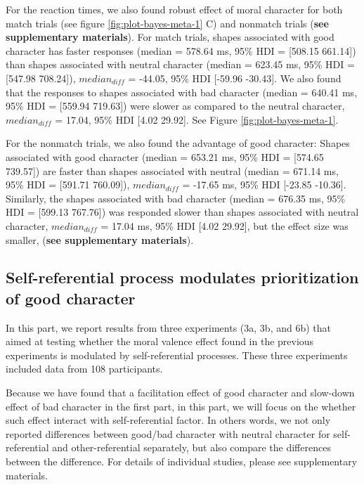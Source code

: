 \documentclass[
  man]{apa6}
\begin{document}
For the reaction times, we also found robust effect of moral character for both match trials (see figure \ref{fig:plot-bayes-meta-1} C) and nonmatch trials (\textbf{see supplementary materials}). For match trials, shapes associated with good character has faster responses (median = 578.64 ms, 95\% HDI = {[}508.15 661.14{]}) than shapes associated with neutral character (median = 623.45 ms, 95\% HDI = {[}547.98 708.24{]}), \(median_{diff}\) = -44.05, 95\% HDI {[}-59.96 -30.43{]}. We also found that the responses to shapes associated with bad character (median = 640.41 ms, 95\% HDI = {[}559.94 719.63{]}) were slower as compared to the neutral character, \(median_{diff}\) = 17.04, 95\% HDI {[}4.02 29.92{]}. See Figure \ref{fig:plot-bayes-meta-1}.

For the nonmatch trials, we also found the advantage of good character: Shapes associated with good character (median = 653.21 ms, 95\% HDI = {[}574.65 739.57{]}) are faster than shapes associated with neutral (median = 671.14 ms, 95\% HDI = {[}591.71 760.09{]}), \(median_{diff}\) = -17.65 ms, 95\% HDI {[}-23.85 -10.36{]}. Similarly, the shapes associated with bad character (median = 676.35 ms, 95\% HDI = {[}599.13 767.76{]}) was responded slower than shapes associated with neutral character, \(median_{diff}\) = 17.04 ms, 95\% HDI {[}4.02 29.92{]}, but the effect size was smaller, (\textbf{see supplementary materials}).

\hypertarget{self-referential-process-modulates-prioritization-of-good-character}{%
\subsection{Self-referential process modulates prioritization of good character}\label{self-referential-process-modulates-prioritization-of-good-character}}

In this part, we report results from three experiments (3a, 3b, and 6b) that aimed at testing whether the moral valence effect found in the previous experiments is modulated by self-referential processes. These three experiments included data from 108 participants.

Because we have found that a facilitation effect of good character and slow-down effect of bad character in the first part, in this part, we will focus on the whether such effect interact with self-referential factor. In others words, we not only reported differences between good/bad character with neutral character for self-referential and other-referential separately, but also compare the differences between the difference. For details of individual studies, please see supplementary materials.
\end{document}
